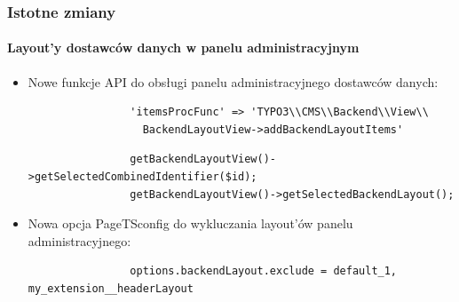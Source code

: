 \begin{frame}[fragile]
	\frametitle{Istotne zmiany}
	\framesubtitle{Layout'y dostawców danych w panelu administracyjnym}

	\begin{itemize}
		\item Nowe funkcje API do obsługi panelu administracyjnego dostawców danych:

			\begin{lstlisting}
				'itemsProcFunc' => 'TYPO3\\CMS\\Backend\\View\\
				  BackendLayoutView->addBackendLayoutItems'
			\end{lstlisting}

			\begin{lstlisting}
				getBackendLayoutView()->getSelectedCombinedIdentifier($id);
				getBackendLayoutView()->getSelectedBackendLayout();
			\end{lstlisting}

		\item Nowa opcja PageTSconfig do wykluczania layout'ów panelu administracyjnego:

			\begin{lstlisting}
				options.backendLayout.exclude = default_1, my_extension__headerLayout
			\end{lstlisting}

	\end{itemize}

\end{frame}



